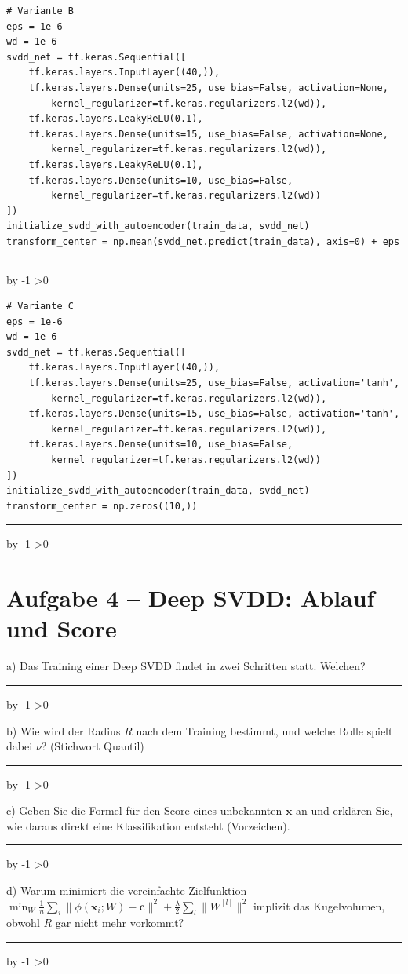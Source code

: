 \documentclass[10pt,a4paper]{article}
\newcommand{\antwortlinien}[1]{%
  \par\vspace{2pt}%
  \newcount\zeilen \zeilen=#1
  \loop
    \noindent\rule{\linewidth}{0.4pt}\par\vspace{11pt}%
    \advance\zeilen by -1
  \ifnum\zeilen>0 \repeat
}
\begin{document}
\Needspace*{8cm}
\begin{lstlisting}
# Variante B
eps = 1e-6
wd = 1e-6
svdd_net = tf.keras.Sequential([
    tf.keras.layers.InputLayer((40,)),
    tf.keras.layers.Dense(units=25, use_bias=False, activation=None,
        kernel_regularizer=tf.keras.regularizers.l2(wd)),
    tf.keras.layers.LeakyReLU(0.1),
    tf.keras.layers.Dense(units=15, use_bias=False, activation=None,
        kernel_regularizer=tf.keras.regularizers.l2(wd)),
    tf.keras.layers.LeakyReLU(0.1),
    tf.keras.layers.Dense(units=10, use_bias=False,
        kernel_regularizer=tf.keras.regularizers.l2(wd))
])
initialize_svdd_with_autoencoder(train_data, svdd_net)
transform_center = np.mean(svdd_net.predict(train_data), axis=0) + eps
\end{lstlisting}
\antwortlinien{3}

\Needspace*{8cm}
\begin{lstlisting}
# Variante C
eps = 1e-6
wd = 1e-6
svdd_net = tf.keras.Sequential([
    tf.keras.layers.InputLayer((40,)),
    tf.keras.layers.Dense(units=25, use_bias=False, activation='tanh',
        kernel_regularizer=tf.keras.regularizers.l2(wd)),
    tf.keras.layers.Dense(units=15, use_bias=False, activation='tanh',
        kernel_regularizer=tf.keras.regularizers.l2(wd)),
    tf.keras.layers.Dense(units=10, use_bias=False,
        kernel_regularizer=tf.keras.regularizers.l2(wd))
])
initialize_svdd_with_autoencoder(train_data, svdd_net)
transform_center = np.zeros((10,))
\end{lstlisting}
\antwortlinien{4}

\section*{Aufgabe 4 -- Deep SVDD: Ablauf und Score}

a) Das Training einer Deep SVDD findet in zwei Schritten statt. Welchen?
\antwortlinien{2}

b) Wie wird der Radius $R$ nach dem Training bestimmt, und welche Rolle spielt dabei
$\nu$? (Stichwort Quantil)
\antwortlinien{3}

c) Geben Sie die Formel für den Score eines unbekannten $\boldsymbol{x}$ an und
erklären Sie, wie daraus direkt eine Klassifikation entsteht (Vorzeichen).
\antwortlinien{3}

d) Warum minimiert die vereinfachte Zielfunktion
$\min_W \frac{1}{n}\sum_i \|\phi(\boldsymbol{x}_i;W)-\boldsymbol{c}\|^2 + \frac{\lambda}{2}\sum_l \|W^{[l]}\|^2$
implizit das Kugelvolumen, obwohl $R$ gar nicht mehr vorkommt?
\antwortlinien{3}
\end{document}
